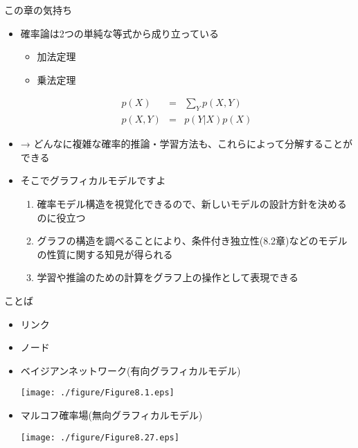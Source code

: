 \begin{frame}{この章の気持ち}
 \begin{itemize}
  \item 確率論は2つの単純な等式から成り立っている
        \begin{itemize}
         \item 加法定理
         \item 乗法定理
        \end{itemize}
        \begin{eqnarray*}
         p(X) &= &\sum_{Y}p(X,Y)\\
         p(X,Y) &=& p(Y|X)p(X)
        \end{eqnarray*}
  \item → どんなに複雑な確率的推論・学習方法も、これらによって分解することができる
  \item そこでグラフィカルモデルですよ
        \begin{enumerate}
         \item 確率モデル構造を視覚化できるので、新しいモデルの設計方針を決めるのに役立つ
         \item グラフの構造を調べることにより、条件付き独立性(8.2章)などのモデルの性質に関する知見が得られる
         \item 学習や推論のための計算をグラフ上の操作として表現できる
        \end{enumerate}
 \end{itemize}
\end{frame}

\begin{frame}{ことば}
 \begin{itemize}
  \item リンク
  \item ノード
  \item ベイジアンネットワーク(有向グラフィカルモデル)

        \texttt{[image: ./figure/Figure8.1.eps]}

  \item マルコフ確率場(無向グラフィカルモデル)

        \texttt{[image: ./figure/Figure8.27.eps]}
 \end{itemize}
\end{frame}

